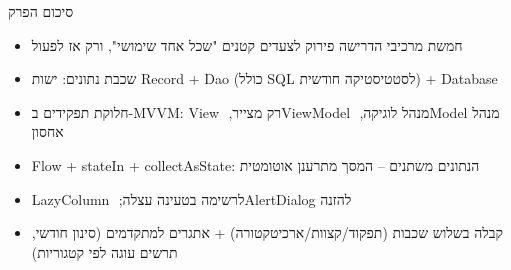 \begin{tcbsummary}{סיכום הפרק}
\begin{itemize}
  \item חמשת מרכיבי הדרישה פירוק לצעדים קטנים "שכל אחד שימושי", ורק אז לפעול
  \item שכבת נתונים: ישות Record + Dao (כולל SQL לסטטיסטיקה חודשית) + Database
  \item חלוקת תפקידים ב-MVVM: ‏View רק מצייר, ‏ViewModel מנהל לוגיקה, ‏Model מנהל אחסון
  \item ‏Flow + stateIn + collectAsState: הנתונים משתנים – המסך מתרענן אוטומטית
  \item ‏LazyColumn לרשימה בטעינה עצלה; ‏AlertDialog להזנה
  \item קבלה בשלוש שכבות (תפקוד/קצוות/ארכיטקטורה) + אתגרים למתקדמים (סינון חודשי, תרשים עוגה לפי קטגוריות)
\end{itemize}

\end{tcbsummary}
